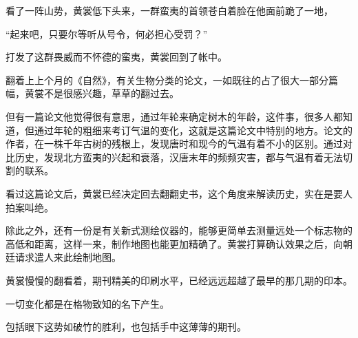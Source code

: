 看了一阵山势，黄裳低下头来，一群蛮夷的首领苍白着脸在他面前跪了一地，

“起来吧，只要尔等听从号令，何必担心受罚？”

打发了这群畏威而不怀德的蛮夷，黄裳回到了帐中。

翻着上上个月的《自然》，有关生物分类的论文，一如既往的占了很大一部分篇幅，黄裳不是很感兴趣，草草的翻过去。

但有一篇论文他觉得很有意思，通过年轮来确定树木的年龄，这件事，很多人都知道，但通过年轮的粗细来考订气温的变化，这就是这篇论文中特别的地方。论文的作者，在一株千年古树的残根上，发现唐时和现今的气温有着不小的区别。通过对比历史，发现北方蛮夷的兴起和衰落，汉唐末年的频频灾害，都与气温有着无法切割的联系。

看过这篇论文后，黄裳已经决定回去翻翻史书，这个角度来解读历史，实在是要人拍案叫绝。

除此之外，还有一份是有关新式测绘仪器的，能够更简单去测量远处一个标志物的高低和距离，这样一来，制作地图也能更加精确了。黄裳打算确认效果之后，向朝廷请求遣人来此绘制地图。

黄裳慢慢的翻看着，期刊精美的印刷水平，已经远远超越了最早的那几期的印本。

一切变化都是在格物致知的名下产生。

包括眼下这势如破竹的胜利，也包括手中这薄薄的期刊。
